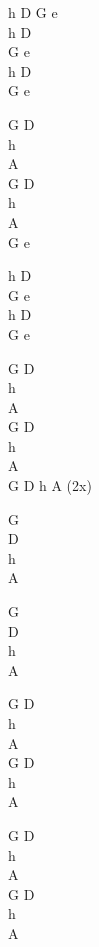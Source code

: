 \begin{chord}
\vin h D G e\\
h D\\
G e\\
h D\\
G e

G D\\
h\\
A\\
G D\\
h\\
A\\
\vin G e

h D\\
G e\\
h D\\
G e

G D\\
h\\
A\\
G D\\
h\\
A\\
\vin G D h A (2x)

G\\
D\\
h\\
A

G\\
D\\
h\\
A

G D\\
h\\
A\\
G D\\
h\\
A

G D\\
h\\
A\\
G D\\
h\\
A
\end{chord}
